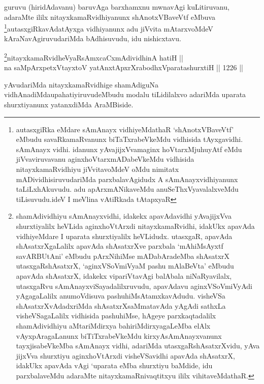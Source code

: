 \begin{artha}
guruvu (hiridAdavanu) baruvAga barxhamxnu mwnavAgi kuLitiruvanu, adaraMte ililx nitayxkamaRvidhiyanunx shAnotxVBaveVtf eMbuva \footnote{autasxgiRka eMdare sAmAnayx vidhiyeMdathaR `shAnotxVBaveVtf' eMbudu savaRkamaRvanunx biTaTxrabeVkeMdu vidhisida tAyxgavidhi. sAmAnayx vidhi. idanunx yAvajijxVvamaginx hoVtarxMjuhuyAtf eMdu jiVvaviruvavanu aginxhoVtarxmADabeVkeMdu vidhisida nitayxkamaRvidhiyu jiVvitavoMdeV oMdu nimitatx mADividhisiruvudariMda parxbalavAgidudx A sAmAnayxvidhiyanunx taLiLxhAkuvudu. adu apArxmANikaveMdu anuSeThxVyavalalxveMdu tiLisuvudu.ideV I meVlina vAtiRkada tAtapxyaR}autasxgiRkavAdatAyxga vidhiyanunx adu jiVvita mAtarxvoMdeV kAraNavAgiruvudariMda bAdhisuvudu, idu nishicxtavu.
\end{artha}

\begin{shl}
\footnote{shamAdividhiyu sAmAnayxvidhi, idakekx apavAdavidhi yAvajijxVva shurxtiyalilx heVLida aginxhoVtArxdi nitayxkamaRvidhi, idakUkx apavAda vidhiyeMdare I uparata shurxtiyalilx heVLidudx. utasxgaR, apavAda shAsatxrXgaLalilx apavAda shAsatxrXve parxbala `mAhiMsAyxtf savARBUtAni' eMbudu pArxNihiMse mADabAradeMba shAsatxrX utasxgaRshAsatxrX, `aginxVSoVmiVyaM pashu mAlaBeVta' eMbudu apavAda shAsatxrX, idakekx vipariVtavAgi balAbala niNaRyavilalx, utasxgaRvu sAmAnayxviSayadalilxruvudu, apavAdavu aginxVSoVmiVyAdi yAgagaLalilx anumoVdisuva pashuhiMsAtamxkavAdudu. visheVSa shAsatxrXvAdadxriMda shAsatxrXsaMmatavAda yAgAdi sathxLa visheVSagaLalilx vidhisida pashuhiMse, hAgeye parxkaqtadalilx shamAdividhiyu aMtariMdirxya bahiriMdirxyagaLeMba elAlx vAyxpAragaLanunx biTiTxrabeVkeMdu kirxyAsAmAnayxvanunx tayxjisabeVkeMba sAmAnayx vidhi, adariMda utasxgaRshAsatxrXvidu, yAva jijxVva shurxtiyu aginxhoVtArxdi visheVSavidhi apavAda shAsatxrX, idakUkx apavAda vAgi `uparata eMba shurxtiyu baMdide, idu parxbalaveMdu adaraMte nitayxkamaRnivaqtitxyu  ililx vihitaveMdathaR.}nitayxkamaRvidheVyaRsAmxcaCxmAdividhinA hatiH || \\
na saMpArxpetxVtayxtoV yatAnxtApxrXrabodhxVparatashurxtiH \hfill || 1226 ||  
\end{shl}

\begin{artha}
yAvudariMda nitayxkamaRvidhige shamAdiguNa vidhAnadiMda\break upahatiyiruvudeMbudu modalu tiLidilalxvo adariMda uparata shurxtiyanunx yatanxdiMda AraMBiside.
\end{artha}


